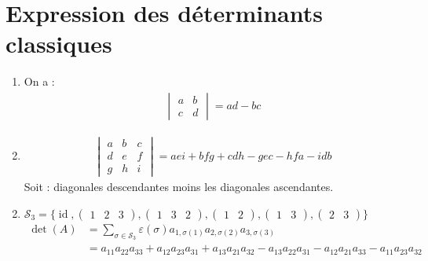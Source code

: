 \documentclass[../main.tex]{subfiles}
\begin{document}
\section{Expression des déterminants classiques}
\begin{tcolorbox}[title=Propostion 30.40, title filled=false, colframe=lightblue, colback=lightblue!10!white]
    \begin{enumerate}
        \item On a : 
        \begin{align*}
            \begin{vmatrix}
                a & b \\
                c & d
            \end{vmatrix} = ad - bc
        \end{align*}
        \item \begin{align*}
            \begin{vmatrix}
                a & b & c \\
                d & e & f \\
                g & h & i
            \end{vmatrix} = aei + bfg + cdh - gec - hfa - idb
        \end{align*}
        Soit : diagonales descendantes moins les diagonales ascendantes. 
    \end{enumerate}
\end{tcolorbox}

\begin{enumerate}
    \setcounter{enumi}{1}
    \item $\mathcal{S}_3 = \{ \operatorname{id}, \begin{pmatrix}
        1 & 2 & 3
    \end{pmatrix}, \begin{pmatrix}
        1 & 3 & 2
    \end{pmatrix}, \begin{pmatrix}
        1 & 2
    \end{pmatrix}, \begin{pmatrix}
        1 & 3
    \end{pmatrix}, \begin{pmatrix}
        2 & 3
    \end{pmatrix} \}$
    \begin{align*}
        \operatorname{det}(A) &= \sum_{\sigma\in \mathcal{S}_3} \varepsilon(\sigma) a_{1, \sigma(1)} a_{2, \sigma(2)} a_{3, \sigma(3)} \\
        &= a_{11}a_{22}a_{33} + a_{12}a_{23}a_{31} + a_{13}a_{21}a_{32} - a_{13}a_{22}a_{31} - a_{12}a_{21}a_{33} - a_{11}a_{23}a_{32}
    \end{align*}
\end{enumerate}
\end{document}
